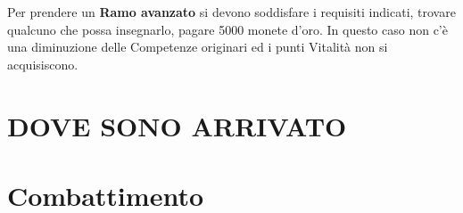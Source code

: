 \documentclass[12pt,a4paper,twoside,openany]{book}
\begin{document}
\begin{multicols}{2}
Per prendere un \textbf{Ramo avanzato} si devono soddisfare i requisiti indicati, trovare qualcuno che possa insegnarlo, pagare 5000 monete d'oro. In questo caso non c'è una diminuzione delle Competenze originari ed i punti Vitalità non si acquisiscono.


\end{multicols}

\pagebreak

\section{DOVE SONO ARRIVATO}

\section{Combattimento}\label{Combattimento}\hypertarget{Combattimento}{}
\end{document}

